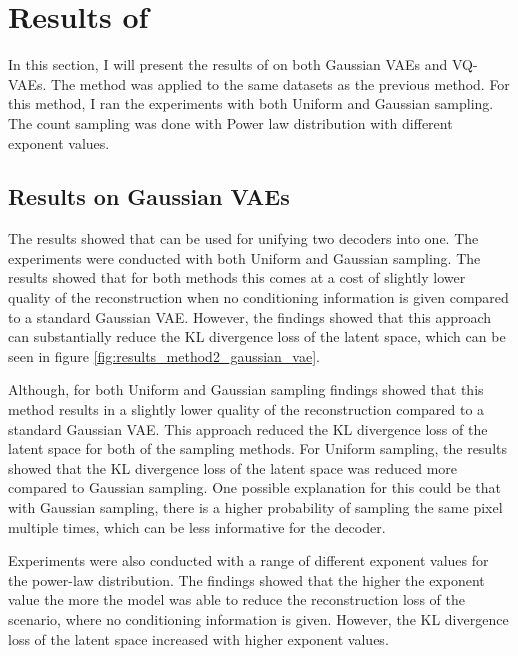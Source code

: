 \section{Results of }

In this section, I will present the results of  on both Gaussian VAEs and VQ-VAEs. The method was applied to the same datasets as the previous method. For this method, I ran the experiments with both Uniform and Gaussian sampling. The count sampling was done with Power law distribution with different exponent values.

\subsection{Results on Gaussian VAEs}

The results showed that  can be used for unifying two decoders into one. The experiments were conducted with both Uniform and Gaussian sampling. The results showed that for both methods this comes at a cost of slightly lower quality of the reconstruction when no conditioning information is given compared to a standard Gaussian VAE. However, the findings showed that this approach can substantially reduce the KL divergence loss of the latent space, which can be seen in figure \ref{fig:results_method2_gaussian_vae}.

Although, for both Uniform and Gaussian sampling findings showed that this method results in a slightly lower quality of the reconstruction compared to a standard Gaussian VAE. This approach reduced the KL divergence loss of the latent space for both of the sampling methods. For Uniform sampling, the results showed that the KL divergence loss of the latent space was reduced more compared to Gaussian sampling. One possible explanation for this could be that with Gaussian sampling, there is a higher probability of sampling the same pixel multiple times, which can be less informative for the decoder.

Experiments were also conducted with a range of different exponent values for the power-law distribution. The findings showed that the higher the exponent value the more the model was able to reduce the reconstruction loss of the scenario, where no conditioning information is given. However, the KL divergence loss of the latent space increased with higher exponent values.

